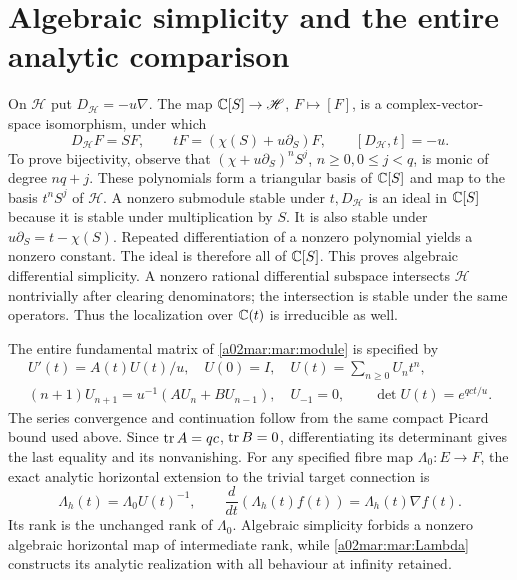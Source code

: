 \documentclass[11pt,a4paper]{article}
\begin{document}
\section{Algebraic simplicity and the entire analytic comparison}
On $\mathscr H$ put $D_{\mathscr H}=-u\nabla$. The map
$\mathbb C[S]\to\mathscr H$, $F\mapsto[F]$, is a complex-vector-space
isomorphism, under which
\begin{equation}\tag{MAR17}\label{a02mar:mar:weyl}
 D_{\mathscr H}F=SF,\qquad
 tF=(\chi(S)+u\partial_S)F,
 \qquad[D_{\mathscr H},t]=-u.
\end{equation}
To prove bijectivity, observe that
$(\chi+u\partial_S)^nS^j$, $n\ge0,0\le j<q$, is monic of degree
$nq+j$. These polynomials form a triangular basis of $\mathbb C[S]$
and map to the basis $t^nS^j$ of $\mathscr H$.
A nonzero submodule stable under $t,D_{\mathscr H}$ is an ideal
in $\mathbb C[S]$ because it is stable under multiplication by $S$.
It is also stable under $u\partial_S=t-\chi(S)$.
Repeated differentiation of a nonzero polynomial yields a nonzero
constant. The ideal is therefore all of $\mathbb C[S]$. This proves
algebraic differential simplicity. A nonzero rational differential
subspace intersects $\mathscr H$ nontrivially after clearing
denominators; the intersection is stable under the same operators.
Thus the localization over $\mathbb C(t)$ is irreducible as well.

The entire fundamental matrix of \eqref{a02mar:mar:module} is specified by
\begin{equation}\tag{MAR18}\label{a02mar:mar:U}
 \begin{gathered}
 U'(t)=A(t)U(t)/u,\quad U(0)=I,\quad
 U(t)=\sum_{n\ge0}U_nt^n,\\
 (n+1)U_{n+1}=u^{-1}(AU_n+BU_{n-1}),\quad U_{-1}=0,
 \qquad\det U(t)=e^{qct/u}.
 \end{gathered}
\end{equation}
The series convergence and continuation follow from the same compact
Picard bound used above. Since $\operatorname{tr} A=qc$, $\operatorname{tr} B=0$, differentiating
its determinant gives the last equality and its nonvanishing.
For any specified fibre map $\Lambda_0:E\to F$, the exact analytic
horizontal extension to the trivial target connection is
\begin{equation}\tag{MAR19}\label{a02mar:mar:Lambda}
 \Lambda_h(t)=\Lambda_0U(t)^{-1},\qquad
 \frac{d}{dt}(\Lambda_h(t)f(t))=\Lambda_h(t)\nabla f(t).
\end{equation}
Its rank is the unchanged rank of $\Lambda_0$. Algebraic simplicity
forbids a nonzero algebraic horizontal map of intermediate rank,
while \eqref{a02mar:mar:Lambda} constructs its analytic realization with
all behaviour at infinity retained.
\end{document}
